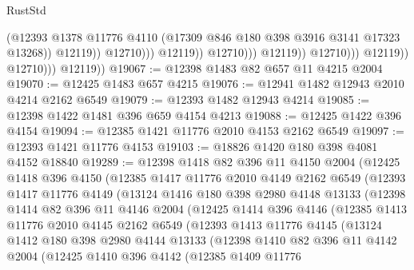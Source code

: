\begin{lexlean}{RustStd}
\begin{coremodule}
                                                (@12393
                                                  @1378
                                                  @11776
                                                  @4110
                                                  (@17309 @846 @180 @398 @3916 @3141 @17323 @13268))
                                                @12119))
                                            @12710)))
                                      @12119))
                                  @12710)))
                            @12119))
                        @12710)))
                  @12119))
              @12710)))
        @12119))
@19067 := @12398 @1483 @82 @657 @11 @4215 @2004
@19070 := @12425 @1483 @657 @4215
@19076 := @12941 @1482 @12943 @2010 @4214 @2162 @6549
@19079 := @12393 @1482 @12943 @4214
@19085 := @12398 @1422 @1481 @396 @659 @4154 @4213
@19088 := @12425 @1422 @396 @4154
@19094 := @12385 @1421 @11776 @2010 @4153 @2162 @6549
@19097 := @12393 @1421 @11776 @4153
@19103 := @18826 @1420 @180 @398 @4081 @4152 @18840
@19289 := @12398
    @1418
    @82
    @396
    @11
    @4150
    @2004
    (@12425
      @1418
      @396
      @4150
      (@12385
        @1417
        @11776
        @2010
        @4149
        @2162
        @6549
        (@12393
          @1417
          @11776
          @4149
          (@13124
            @1416
            @180
            @398
            @2980
            @4148
            @13133
            (@12398
              @1414
              @82
              @396
              @11
              @4146
              @2004
              (@12425
                @1414
                @396
                @4146
                (@12385
                  @1413
                  @11776
                  @2010
                  @4145
                  @2162
                  @6549
                  (@12393
                    @1413
                    @11776
                    @4145
                    (@13124
                      @1412
                      @180
                      @398
                      @2980
                      @4144
                      @13133
                      (@12398
                        @1410
                        @82
                        @396
                        @11
                        @4142
                        @2004
                        (@12425
                          @1410
                          @396
                          @4142
                          (@12385
                            @1409
                            @11776

\end{coremodule}
\end{lexlean}
